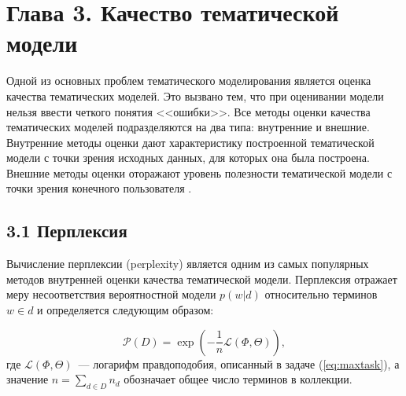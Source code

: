 \documentclass[a4paper]{report}
\begin{document}
	
	
	
	
	
	\newpage
	\section{Глава 3. Качество тематической модели}
	
	Одной из основных проблем тематического моделирования является оценка качества тематических моделей. 
	Это вызвано тем, что при оценивании модели нельзя ввести четкого понятия <<ошибки>>.
	Все методы оценки качества тематических моделей подразделяются на два типа: внутренние и внешние. Внутренние методы оценки дают характеристику построенной тематической модели с точки зрения исходных данных, для которых она была построена. 
	Внешние методы оценки оторажают уровень полезности тематической модели с точки зрения конечного пользователя \cite{bib:Voron1}.
	
	\subsection{3.1 Перплексия}
	
	Вычисление перплексии (perplexity) является одним из самых популярных методов внутренней оценки качества тематической модели. Перплексия отражает меру несоответствия вероятностной модели $p(w|d)$ относительно терминов $w \in d$ и определяется следующим образом:
	
	\begin{equation}
		\mathcal{P}(D) = \exp \left( - \dfrac1n \mathcal{L}(\Phi, \Theta) \right),
	\label{eq:perplexity}
	\end{equation}
	где $\mathcal{L}(\Phi, \Theta)$~--- логарифм правдоподобия, описанный в задаче (\ref{eq:maxtask}), а значение $n = \sum_{d \in D} n_d $ обозначает общее число терминов в коллекции.
	
\end{document}
